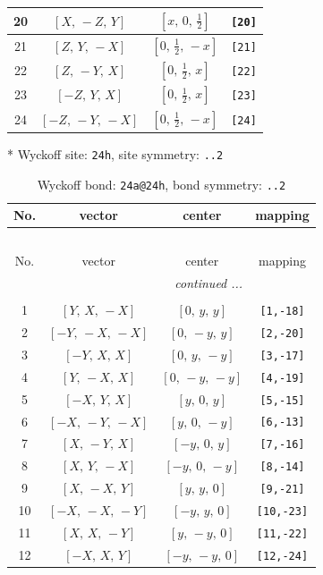 \documentclass[fleqn,8pt]{jsarticle}
\begin{document}
\begin{longtable}{cccc}
20 & $\left[ X,\, - Z,\, Y \right]$ & $\left[ x,\, 0,\, \frac{1}{2} \right]$ & {\tt [20]} \\ \hline
21 & $\left[ Z,\, Y,\, - X \right]$ & $\left[ 0,\, \frac{1}{2},\, - x \right]$ & {\tt [21]} \\ \hline
22 & $\left[ Z,\, - Y,\, X \right]$ & $\left[ 0,\, \frac{1}{2},\, x \right]$ & {\tt [22]} \\ \hline
23 & $\left[ - Z,\, Y,\, X \right]$ & $\left[ 0,\, \frac{1}{2},\, x \right]$ & {\tt [23]} \\ \hline
24 & $\left[ - Z,\, - Y,\, - X \right]$ & $\left[ 0,\, \frac{1}{2},\, - x \right]$ & {\tt [24]} \\
\end{longtable}
* Wyckoff site: {\tt 24h}, site symmetry: {\tt ..2}
\renewcommand{\arraystretch}{1.2}
\begin{longtable}{cccc}
\caption{Wyckoff bond: {\tt 24a@24h}, bond symmetry: {\tt ..2}}
 \\
 \hline \hline
No. & vector & center & mapping \\ \hline \endfirsthead

\multicolumn{3}{l}{\tablename\ \thetable{}} \\
 \hline \hline
No. & vector & center & mapping \\ \hline \endhead

 \hline \hline
\multicolumn{3}{r}{\footnotesize\it continued ...} \\ \endfoot

 \hline \hline
\multicolumn{3}{r}{} \\ \endlastfoot

1 & $\left[ Y,\, X,\, - X \right]$ & $\left[ 0,\, y,\, y \right]$ & {\tt [1,-18]} \\ \hline
2 & $\left[ - Y,\, - X,\, - X \right]$ & $\left[ 0,\, - y,\, y \right]$ & {\tt [2,-20]} \\ \hline
3 & $\left[ - Y,\, X,\, X \right]$ & $\left[ 0,\, y,\, - y \right]$ & {\tt [3,-17]} \\ \hline
4 & $\left[ Y,\, - X,\, X \right]$ & $\left[ 0,\, - y,\, - y \right]$ & {\tt [4,-19]} \\ \hline
5 & $\left[ - X,\, Y,\, X \right]$ & $\left[ y,\, 0,\, y \right]$ & {\tt [5,-15]} \\ \hline
6 & $\left[ - X,\, - Y,\, - X \right]$ & $\left[ y,\, 0,\, - y \right]$ & {\tt [6,-13]} \\ \hline
7 & $\left[ X,\, - Y,\, X \right]$ & $\left[ - y,\, 0,\, y \right]$ & {\tt [7,-16]} \\ \hline
8 & $\left[ X,\, Y,\, - X \right]$ & $\left[ - y,\, 0,\, - y \right]$ & {\tt [8,-14]} \\ \hline
9 & $\left[ X,\, - X,\, Y \right]$ & $\left[ y,\, y,\, 0 \right]$ & {\tt [9,-21]} \\ \hline
10 & $\left[ - X,\, - X,\, - Y \right]$ & $\left[ - y,\, y,\, 0 \right]$ & {\tt [10,-23]} \\ \hline
11 & $\left[ X,\, X,\, - Y \right]$ & $\left[ y,\, - y,\, 0 \right]$ & {\tt [11,-22]} \\ \hline
12 & $\left[ - X,\, X,\, Y \right]$ & $\left[ - y,\, - y,\, 0 \right]$ & {\tt [12,-24]} \\
\end{longtable}
\end{document}
